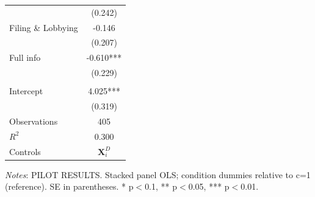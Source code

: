 \documentclass[11pt]{article}
\begin{document}
\begin{table}[!htbp]
\begin{threeparttable}
\begin{tabular}{l|c}
 & (0.242) \\
Filing \& Lobbying & -0.146 \\
 & (0.207) \\
Full info & -0.610*** \\
 & (0.229) \\
\\[0.5em]
Intercept & 4.025*** \\
 & (0.319) \\
\midrule
Observations & 405 \\
$R^2$ & 0.300 \\
Controls & $\mathbf{X}_{i}^{D}$ \\
\bottomrule
\end{tabular}
\begin{tablenotes}[flushleft]
\footnotesize
\item \textit{Notes}: PILOT RESULTS. Stacked panel OLS; condition dummies relative to c=1 (reference). SE in parentheses. * p$<$0.1, ** p$<$0.05, *** p$<$0.01.
\end{tablenotes}
\end{threeparttable}
\end{table}
\end{document}
